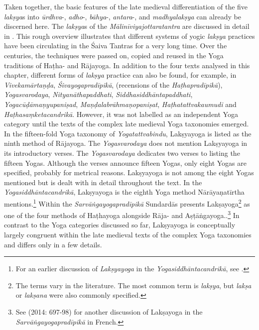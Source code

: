 {Taken together, the basic features of the late medieval differentiation of the five \textit{lakṣya}s into \textit{ūrdhva}-, \textit{adho}-, \textit{bāhya}-, \textit{antara}-, and \textit{madhyalakṣya} can already be discerned here. The \textit{lakṣya}s of the \textit{Mālinīviyajottaratantra} are discussed in detail in \citeauthor[2004: 253-293]{vasudeva2004}. This rough overview illustrates that different systems of yogic \textit{lakṣya} practices have been circulating in the Śaiva Tantras for a very long time. Over the centuries, the techniques were passed on, copied and reused in the Yoga traditions of Haṭha- and Rājayoga. In addition to the four texts analysed in this chapter, different forms of \textit{lakṣya} practice can also be found, for example, in \textit{Vivekamārtaṇḍa}, \textit{Śivayogapradīpikā}, (recensions of the \textit{Haṭhapradīpikā}), \textit{Yogasvarodaya}, \textit{Nityanāthapaddhati}, \textit{Siddhasiddhāntapaddhati}, \textit{Yogacūḍāmaṇyupaniṣad}, \textit{Maṇḍalabrāhmaṇopaniṣat}, \textit{Haṭhatattvakaumudi} and \textit{Haṭhasaṃketacandrikā}.\label{saivaparadigm}} However, it was not labelled as an independent Yoga category until the texts of the complex late medieval Yoga taxonomies emerged. In the fifteen-fold Yoga taxonomy of \textit{Yogatattvabindu}, Lakṣyayoga is listed as the ninth method of Rājayoga. The \textit{Yogasvarodaya} does not mention Lakṣyayoga in its introductory verses. The \textit{Yogasvarodaya} dedicates two verses to listing the fifteen Yogas. Although the verses announce fifteen Yogas, only eight Yogas are specified, probably for metrical reasons. Lakṣyayoga is not among the eight Yogas mentioned but is dealt with in detail throughout the text. In the \textit{Yogasiddhāntacandrikā}, Lakṣyayoga is the eighth Yoga method Nārāyaṇatīrtha mentions.\footnote{For an earlier discussion of \textit{Lakṣyayoga} in the \textit{Yogasiddhāntacandrikā}, see \citeauthor[2004: 77-78]{penna2004}.} Within the \textit{Sarvāṅgayogapradīpikā} Sundardās presents Lakṣayoga\footnote{The terms vary in the literature. The most common term is \textit{lakṣya}, but \textit{lakṣa} or \textit{lakṣana} were also commonly specified.} as one of the four methods of Haṭhayoga alongside Rāja- and Aṣṭāṅgayoga..\footnote{See \citeauthor{burger2014sarvangayogapradipika} (2014: 697-98) for another discussion of Lakṣayoga in the \textit{Sarvāṅgayogapradīpikā} in French.} In contrast to the Yoga categories discussed so far, Lakṣyayoga is conceptually largely congruent within the late medieval texts of the complex Yoga taxonomies and differs only in a few details.

